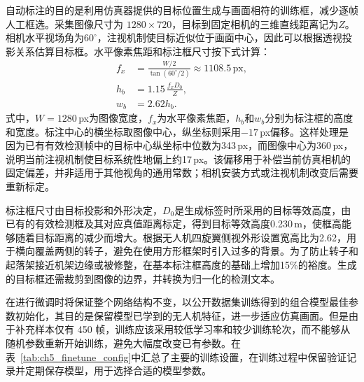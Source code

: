 自动标注的目的是利用仿真器提供的目标位置生成与画面相符的训练框，减少逐帧人工框选。采集图像尺寸为 $1280\times720$，目标到固定相机的三维直线距离记为$Z$。相机水平视场角为$60^{\circ}$，注视机制使目标近似位于画面中心，因此可以根据透视投影关系估算目标框。水平像素焦距和标注框尺寸按下式计算：
\begin{equation}
\begin{aligned}
f_x&=\frac{W/2}{\tan(60^{\circ}/2)}\approx1108.5\,\mathrm{px},\\
h_b&=1.15\,\frac{f_xD_0}{Z},\\
w_b&=2.62h_b.
\end{aligned}
\label{eq:ch5_autobox}
\end{equation}
式中，$W=1280$\,px为图像宽度，$f_x$为水平像素焦距，$h_b$和$w_b$分别为标注框的高度和宽度。标注中心的横坐标取图像中心，纵坐标则采用$-17$\,px偏移。这样处理是因为已有有效检测帧中的目标中心纵坐标中位数为343\,px，而图像中心为360\,px，说明当前注视机制使目标系统性地偏上约17\,px。该偏移用于补偿当前仿真相机的固定偏差，并非适用于其他视角的通用常数；相机安装方式或注视机制改变后需要重新标定。

标注框尺寸由目标投影和外形决定，$D_0$是生成标签时所采用的目标等效高度，由已有的有效检测框及其对应真值距离标定，得到目标等效高度0.230\,m，使框高能够随着目标距离的减少而增大。根据无人机四旋翼侧视外形设置宽高比为2.62，用于横向覆盖两侧的转子，避免在使用方形框架时引入过多的背景。为了防止转子和起落架接近机架边缘或被修整，在基本标注框高度的基础上增加15\%的裕度。生成的目标框还需裁剪到图像的边界，并转换为归一化的检测文本。

在进行微调时将保证整个网络结构不变，以公开数据集训练得到的组合模型最佳参数初始化，其目的是保留模型已学到的无人机特征，进一步适应仿真画面。但是由于补充样本仅有 450 帧，训练应该采用较低学习率和较少训练轮次，而不能够从随机参数重新开始训练，避免大幅度改变已有参数。在表~\ref{tab:ch5_finetune_config}中汇总了主要的训练设置，在训练过程中保留验证记录并定期保存模型，用于选择合适的模型参数。

